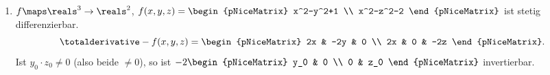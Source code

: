 \begin{beispiele*}
  \begin{enumerate}
    \item \label{implizite_funktion_beispiel_fuer_dgls}\( f\maps \reals^3\to \reals^2 \), \( f(x,y,z)=\begin{pNiceMatrix} x^2-y^2+1 \\ x^2-z^2-2 \end{pNiceMatrix} \) ist stetig differenzierbar.
    \begin{equation*}
      \totalderivative-{f}(x,y,z)=\begin{pNiceMatrix} 2x & -2y & 0 \\ 2x & 0 & -2z \end{pNiceMatrix}.
    \end{equation*}
    Ist  \( y_0\cdot z_0\neq 0 \) (also beide \( \neq 0 \)), so ist \( -2 \begin{pNiceMatrix} y_0 & 0 \\ 0 & z_0 \end{pNiceMatrix} \) invertierbar.


\end{enumerate}
\end{beispiele*}
